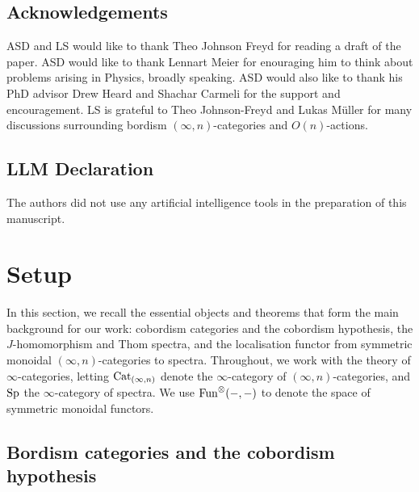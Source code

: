 \documentclass{amsart}
\begin{document}
\subsection*{Acknowledgements}
ASD and LS would like to thank Theo Johnson Freyd for reading a draft of the paper. ASD would like to thank Lennart Meier for enouraging him to think about problems arising in Physics, broadly speaking. ASD would also like to thank his PhD advisor Drew Heard and Shachar Carmeli for the support and encouragement. LS is grateful to Theo Johnson-Freyd and Lukas M\"uller for many discussions surrounding bordism $(\infty,n)$-categories and $O(n)$-actions.
\subsection*{LLM Declaration}
The authors did not use any artificial intelligence tools in the preparation of this manuscript.
\section{Setup}\label{sec:setup}
\noindent
In this section, we recall the essential objects and theorems that form the main background for our work: cobordism categories and the cobordism hypothesis, the $J$-homomorphism and Thom spectra, and the localisation functor from symmetric monoidal $(\infty,n)$-categories to spectra. Throughout, we work with the theory of $\infty$-categories, letting $\operatorname{Cat}_{(\infty,n)}$ denote the $\infty$-category of $(\infty,n)$-categories, and $\operatorname{Sp}$ the $\infty$-category of spectra. We use $\operatorname{Fun}^{\otimes}(-,-)$ to denote the space of symmetric monoidal functors. 

\subsection{Bordism categories and the cobordism hypothesis}\label{sec:bordism}
\end{document}
